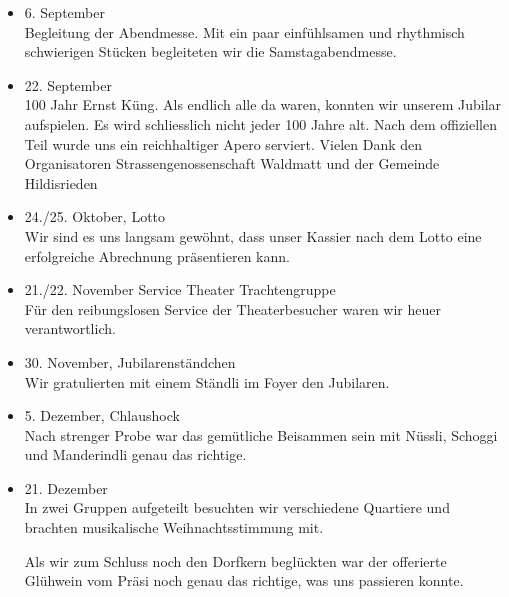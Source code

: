 \begin{history}
\begin{itemize}
        \item 6. September\\
              Begleitung der Abendmesse. Mit ein paar einfühlsamen und rhythmisch
              schwierigen Stücken begleiteten wir die Samstagabendmesse.

        \item 22. September\\
              100 Jahr Ernst Küng. Als endlich alle da waren, konnten wir unserem
              Jubilar aufspielen. Es wird schliesslich nicht jeder 100 Jahre alt. Nach
              dem offiziellen Teil wurde uns ein reichhaltiger Apero serviert. Vielen
              Dank den Organisatoren Strassengenossenschaft Waldmatt und der Gemeinde
              Hildisrieden

        \item 24./25. Oktober, Lotto\\
              Wir sind es uns langsam gewöhnt, dass unser Kassier nach dem Lotto eine
              erfolgreiche Abrechnung präsentieren kann.

        \item 21./22. November Service Theater Trachtengruppe\\
              Für den reibungslosen Service der Theaterbesucher waren wir heuer
              verantwortlich.

        \item 30. November, Jubilarenständchen\\
              Wir gratulierten mit einem Ständli im Foyer den
              Jubilaren.

        \item 5. Dezember, Chlaushock\\
              Nach strenger Probe war das gemütliche Beisammen sein mit
              Nüssli, Schoggi und Manderindli genau das richtige.

        \item 21. Dezember\\
              In zwei Gruppen aufgeteilt besuchten wir verschiedene Quartiere und
              brachten musikalische Weihnachtsstimmung mit.

              Als wir zum Schluss noch den Dorfkern beglückten war der offerierte
              Glühwein vom Präsi noch genau das richtige, was uns passieren konnte.

    \end{itemize}

\end{history}
